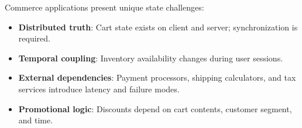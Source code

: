 Commerce applications present unique state challenges:

\begin{itemize}
\item \textbf{Distributed truth}: Cart state exists on client and server; synchronization is required.
\item \textbf{Temporal coupling}: Inventory availability changes during user sessions.
\item \textbf{External dependencies}: Payment processors, shipping calculators, and tax services introduce latency and failure modes.
\item \textbf{Promotional logic}: Discounts depend on cart contents, customer segment, and time.
\end{itemize}

